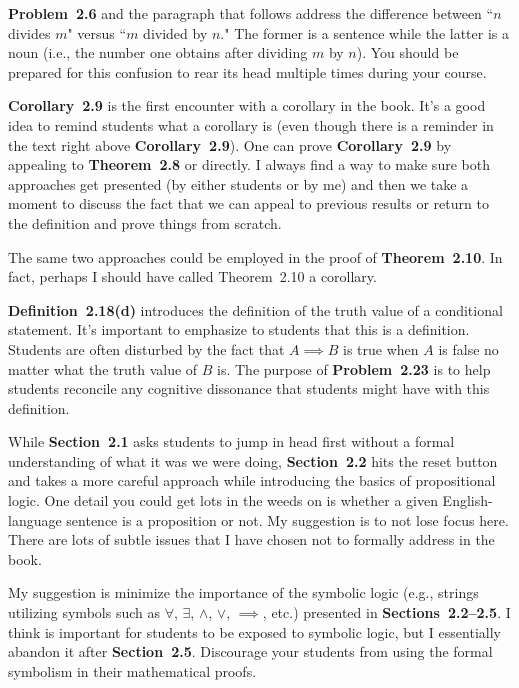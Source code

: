 \documentclass[11pt]{article}%
\newcommand{\blankline}{\pagebreak[2]\vspace{.5\baselineskip}}
\begin{document}
\blankline

\textbf{Problem~2.6} and the paragraph that follows address the difference between ``$n$ divides $m$" versus ``$m$ divided by $n$."  The former is a sentence while the latter is a noun (i.e., the number one obtains after dividing $m$ by $n$).  You should be prepared for this confusion to rear its head multiple times during your course.

\blankline

\textbf{Corollary~2.9} is the first encounter with a corollary in the book. It's a good idea to remind students what a corollary is (even though there is a reminder in the text right above \textbf{Corollary~2.9}).  One can prove \textbf{Corollary~2.9} by appealing to \textbf{Theorem~2.8} or directly.  I always find a way to make sure both approaches get presented (by either students or by me) and then we take a moment to discuss the fact that we can appeal to previous results or return to the definition and prove things from scratch.

\blankline

The same two approaches could be employed in the proof of \textbf{Theorem~2.10}.  In fact, perhaps I should have called Theorem~2.10 a corollary.

\blankline

\textbf{Definition~2.18(d)} introduces the definition of the truth value of a conditional statement.  It's important to emphasize to students that this is a definition.  Students are often disturbed by the fact that $A \implies B$ is true when $A$ is false no matter what the truth value of $B$ is.  The purpose of \textbf{Problem~2.23} is to help students reconcile any cognitive dissonance that students might have with this definition.

\blankline

While \textbf{Section~2.1} asks students to jump in head first without a formal understanding of what it was we were doing, \textbf{Section~2.2} hits the reset button and takes a more careful approach while introducing the basics of propositional logic.  One detail you could get lots in the weeds on is whether a given English-language sentence is a proposition or not.  My suggestion is to not lose focus here.  There are lots of subtle issues that I have chosen not to formally address in the book. 

\blankline

My suggestion is minimize the importance of the symbolic logic (e.g., strings utilizing symbols such as $\forall$, $\exists$, $\wedge$, $\vee$, $\implies$, etc.) presented in \textbf{Sections~2.2--2.5}.  I think is important for students to be exposed to symbolic logic, but I essentially abandon it after \textbf{Section~2.5}.  Discourage your students from using the formal symbolism in their mathematical proofs.
\end{document}
